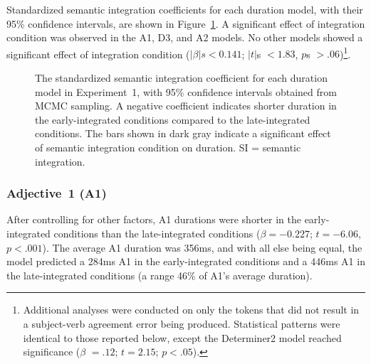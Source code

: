 \documentclass[12pt,titlepage]{article}
\newcommand{\framefig}[1]{#1}
\begin{document}

Standardized semantic integration coefficients for each duration model, with their 95\% confidence intervals, are shown in Figure~\ref{HP2DurResults}. A significant effect of integration condition was observed in the A1, D3, and A2 models. No other models showed a significant effect of integration condition ($|\beta|s < 0.141$; $|t|$s $< 1.83$, $p$s $> .06$)\footnote{Additional analyses were conducted on only the tokens that did not result in a subject-verb agreement error being produced. Statistical patterns were identical to those reported below, except the Determiner2 model reached significance ($\beta$ $= .12$; $t = 2.15$; $p < .05$).}.


{\begin{figure}[tb]
%
  \makebox[\textwidth][c]{\framefig{\texttt{[image: HP2DurationNoBreak]}}}

    \caption{The standardized semantic integration coefficient for each duration model in Experiment~1, with 95\% confidence intervals obtained from MCMC sampling. A negative coefficient indicates shorter duration in the early-integrated conditions compared to the late-integrated conditions. The bars shown in dark gray indicate a significant effect of semantic integration condition on duration. SI = semantic integration.}

\label{HP2DurResults}
\end{figure}}


\subsubsection{Adjective~1 (A1)} After controlling for other factors, A1 durations were shorter in the early-integrated conditions than the late-integrated conditions ($\beta = - 0.227$; $t = -6.06$, $p < .001$). The average A1 duration was 356ms, and with all else being equal, the model predicted a 284ms A1 in the early-integrated conditions and a 446ms A1 in the late-integrated conditions (a range 46\% of A1's average duration).
\end{document}
